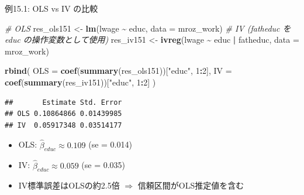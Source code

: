 \documentclass[
  ignorenonframetext,
]{beamer}
\newenvironment{Shaded}{\begin{snugshade}}{\end{snugshade}}
\newcommand{\AttributeTok}[1]{\textcolor[rgb]{0.13,0.29,0.53}{#1}}
\newcommand{\CommentTok}[1]{\textcolor[rgb]{0.56,0.35,0.01}{\textit{#1}}}
\newcommand{\DecValTok}[1]{\textcolor[rgb]{0.00,0.00,0.81}{#1}}
\newcommand{\FunctionTok}[1]{\textcolor[rgb]{0.13,0.29,0.53}{\textbf{#1}}}
\newcommand{\NormalTok}[1]{#1}
\newcommand{\OtherTok}[1]{\textcolor[rgb]{0.56,0.35,0.01}{#1}}
\newcommand{\SpecialCharTok}[1]{\textcolor[rgb]{0.81,0.36,0.00}{\textbf{#1}}}
\newcommand{\StringTok}[1]{\textcolor[rgb]{0.31,0.60,0.02}{#1}}
\providecommand{\tightlist}{%
  \setlength{\itemsep}{0pt}\setlength{\parskip}{0pt}}
\begin{document}
\begin{frame}[fragile]{例15.1: OLS vs IV の比較}
\label{ux4f8b15.1-ols-vs-iv-ux306eux6bd4ux8f03}
\footnotesize

\begin{Shaded}
\begin{Highlighting}[]
\CommentTok{\# OLS}
\NormalTok{res\_ols151 }\OtherTok{\textless{}{-}} \FunctionTok{lm}\NormalTok{(lwage }\SpecialCharTok{\textasciitilde{}}\NormalTok{ educ, }\AttributeTok{data =}\NormalTok{ mroz\_work)}
\CommentTok{\# IV (fatheduc を educ の操作変数として使用)}
\NormalTok{res\_iv151 }\OtherTok{\textless{}{-}} \FunctionTok{ivreg}\NormalTok{(lwage }\SpecialCharTok{\textasciitilde{}}\NormalTok{ educ }\SpecialCharTok{|}\NormalTok{ fatheduc, }\AttributeTok{data =}\NormalTok{ mroz\_work)}

\FunctionTok{rbind}\NormalTok{(}
  \AttributeTok{OLS =} \FunctionTok{coef}\NormalTok{(}\FunctionTok{summary}\NormalTok{(res\_ols151))[}\StringTok{"educ"}\NormalTok{, }\DecValTok{1}\SpecialCharTok{:}\DecValTok{2}\NormalTok{],}
  \AttributeTok{IV  =} \FunctionTok{coef}\NormalTok{(}\FunctionTok{summary}\NormalTok{(res\_iv151))[}\StringTok{"educ"}\NormalTok{, }\DecValTok{1}\SpecialCharTok{:}\DecValTok{2}\NormalTok{]}
\NormalTok{)}
\end{Highlighting}
\end{Shaded}

\begin{verbatim}
##       Estimate Std. Error
## OLS 0.10864866 0.01439985
## IV  0.05917348 0.03514177
\end{verbatim}

\normalsize

\begin{itemize}
\tightlist
\item
  OLS: \(\hat{\beta}_{educ} \approx 0.109\) (se = 0.014)
\item
  IV: \(\hat{\beta}_{educ} \approx 0.059\) (se = 0.035)
\item
  IV標準誤差はOLSの約2.5倍 \(\Rightarrow\) 信頼区間がOLS推定値を含む
\end{itemize}
\end{frame}
\end{document}
